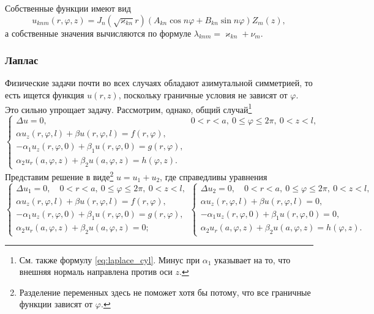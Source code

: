 Собственные функции имеют вид 
\[
  u_{knm}(r, \varphi, z) = J_n \left( \sqrt{\varkappa_{kn}}r \right) (A_{kn}
\cos n\varphi + B_{kn} \sin n\varphi) Z_m(z),
\]
а собственные значения вычисляются по формуле $ \lambda_{knm} = \varkappa_{kn} +
\nu_m$.



\subsubsection{Лаплас}
\label{sec:laplace_cylinder}
Физические задачи почти во всех случаях обладают азимутальной симметрией, то есть ищется
функция $ u(r, z) $, поскольку граничные условия не
зависят от $ \varphi $. Это сильно упрощает задачу. Рассмотрим, однако, общий
случай\footnote{См. также формулу \eqref{eq:laplace_cyl}. Минус при $ \alpha_1 $
указывает на то, что внешняя нормаль направлена против оси $ z
$.}
\[
  \begin{cases}
    \Delta u = 0, & 0 < r < a, \ 0\leqslant \varphi \leqslant 2\pi,
    \ 0 < z < l,\\
    \alpha u_z(r, \varphi, l) + \beta u(r,\varphi, l) = f(r, \varphi),\\
    -\alpha_1 u_z(r,\varphi, 0) + \beta_1 u(r,\varphi, 0) = g(r, \varphi),\\
    \alpha_2 u_r(a,\varphi, z) + \beta_2 u(a,\varphi, z) = h(\varphi, z).
  \end{cases}
\]
Представим решение в виде\footnote{Разделение переменных здесь не поможет
хотя бы потому, что все граничные функции зависят от $ \varphi $.} $ u = u_1 +
u_2 $, где справедливы уравнения  
\[
  \begin{cases}
    \Delta u_1 = 0, \quad 0 < r < a, \ 0\leqslant \varphi \leqslant 2\pi,
    \ 0 < z < l, \\
    \alpha u_z(r, \varphi, l) + \beta u(r,\varphi, l) = f(r, \varphi),\\
    -\alpha_1 u_z(r,\varphi, 0) + \beta_1 u(r,\varphi, 0) = g(r, \varphi),\\
    \alpha_2 u_r(a,\varphi, z) + \beta_2 u(a,\varphi, z) = 0;
  \end{cases} 
  \begin{cases}
    \Delta u_2 = 0, \quad 0 < r < a, \ 0\leqslant \varphi \leqslant 2\pi,
    \ 0 < z < l, \\
    \alpha u_z(r, \varphi, l) + \beta u(r,\varphi, l) = 0,\\
    -\alpha_1 u_z(r,\varphi, 0) + \beta_1 u(r,\varphi, 0) = 0,\\
    \alpha_2 u_r(a,\varphi, z) + \beta_2 u(a,\varphi, z) = h(\varphi, z).
  \end{cases}
\]
